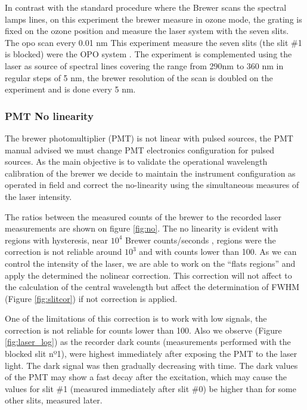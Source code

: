 \documentclass[acp]{copernicus} %
\begin{document}


In contrast with the standard procedure where the Brewer scans the spectral lamps lines, on this experiment the brewer measure in ozone mode, the grating is fixed on the ozone position and measure the laser system with the seven slits. The opo scan every 0.01 \unit{nm}  This experiment  measure the seven slits (the slit  \#1 is blocked) were the OPO system . The experiment is complemented using the laser as source of spectral lines covering the range from 290\unit{nm} to 360 \unit{nm} in regular steps of 5 \unit{nm}, the brewer resolution of the scan is doubled on the experiment and is done every 5 \unit{nm}.



\subsubsection{PMT No linearity}

The brewer photomultiplier (PMT) is not linear with pulsed sources, the PMT manual advised  we must change PMT electronics configuration for pulsed sources.   As the main objective is to validate the operational wavelength calibration of the brewer  we decide to maintain the instrument configuration as operated in field and correct the no-linearity using the simultaneous measures of the laser intensity.


The ratios between the measured counts of the  brewer to the recorded laser measurements are shown on figure  \ref{fig:no}. The no linearity is evident with regions with hysteresis, near $10^4$  Brewer counts/seconds ,  regions were the correction is not reliable  around $10^3$ and  with counts lower than 100. As we can control the intensity of the laser, we are able to work on the “flats regions” and apply the determined the nolinear correction. This correction will not affect to the calculation of the central wavelength but affect the determination of FWHM (Figure \ref{fig:slitcor}) if not correction is applied.

One of the limitations of this correction is to work with low signals, the correction is not reliable for counts lower than 100. Also we observe (Figure \ref{fig:laser_log}) as the recorder dark counts (measurements performed with the blocked slit nº1), were highest immediately after exposing the PMT to the laser light. The dark signal was then gradually decreasing with time. The dark values of the PMT may show a fast decay after the excitation, which may cause the values for slit \#1 (measured immediately after slit \#0) be higher than for some other slits, measured later.
\end{document}
